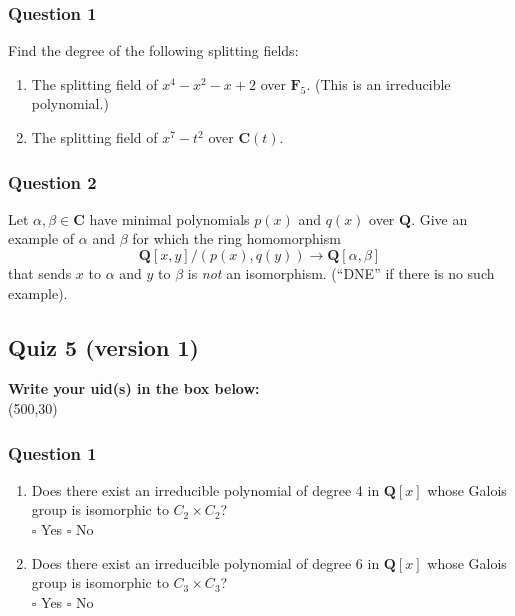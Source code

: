 \documentclass[11pt]{article}
\begin{document}
\vspace{1cm}
\subsubsection{Question 1}
\label{sec:org0b970c6}
Find the degree of the following splitting fields:

\begin{enumerate}
\item The splitting field of \(x^4-x^2-x+2\) over \(\mathbf{F}_5\).  (This is an irreducible polynomial.)

\vspace{3cm}

\item The splitting field of \(x^7 - t^2\) over \(\mathbf{C}(t)\).

\vspace{3cm}
\end{enumerate}
\subsubsection{Question 2}
\label{sec:org2d6d4b3}

Let \(\alpha, \beta \in \mathbf{C}\) have minimal polynomials \(p(x)\) and \(q(x)\) over \(\mathbf{Q}\).
Give an example of \(\alpha\) and \(\beta\) for which the ring homomorphism
\[ \mathbf{Q}[x,y]/(p(x), q(y)) \to \mathbf{Q}[\alpha,\beta]\]
that sends \(x\) to \(\alpha\) and \(y\) to \(\beta\) is \emph{not} an isomorphism.
(``DNE'' if there is no such example).
\subsection{Quiz 5 (version 1)}
\label{sec:org5983e5a}
\vspace{1cm}

\noindent
\textbf{Write your uid(s) in the box below:}\\
\framebox(500,30)

\vspace{1cm}
\subsubsection{Question 1}
\label{sec:org14723fc}
\begin{enumerate}
\item Does there exist an irreducible polynomial of degree 4 in \(\mathbf{Q}[x]\) whose Galois group is isomorphic to \(C_2 \times C_2\)?\\

\qquad \(\square\) Yes \qquad \(\square\)   No \\

\item Does there exist an irreducible polynomial of degree 6 in \(\mathbf{Q}[x]\) whose Galois group is isomorphic to \(C_3 \times C_3\)?\\

\qquad \(\square\) Yes \qquad \(\square\)   No \\
\end{enumerate}
\end{document}
